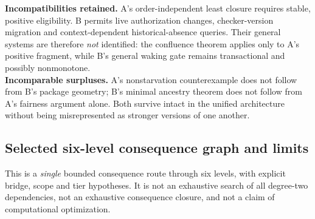 \documentclass[11pt,letterpaper]{article}
\begin{document}
\textbf{Incompatibilities retained.} A's order-independent least closure requires stable, positive eligibility. B permits live authorization changes, checker-version migration and context-dependent historical-absence queries. Their general systems are therefore \emph{not} identified: the confluence theorem applies only to A's positive fragment, while B's general waking gate remains transactional and possibly nonmonotone.\\
\textbf{Incomparable surpluses.} A's nonstarvation counterexample does not follow from B's package geometry; B's minimal ancestry theorem does not follow from A's fairness argument alone. Both survive intact in the unified architecture without being misrepresented as stronger versions of one another.

\subsection{Selected six-level consequence graph and limits}
\begin{center}
\end{center}
This is a \emph{single} bounded consequence route through six levels, with explicit bridge, scope and tier hypotheses. It is not an exhaustive search of all degree-two dependencies, not an exhaustive consequence closure, and not a claim of computational optimization.
\end{document}
